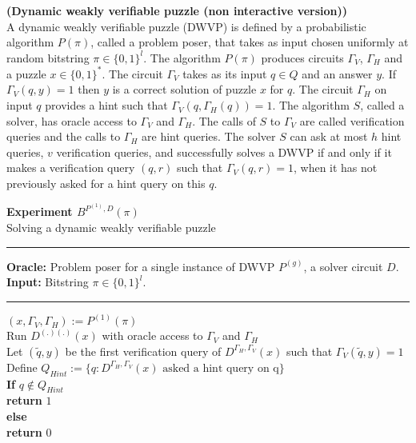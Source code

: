 %
%
%
\begin{definition} {\textbf{(Dynamic weakly verifiable puzzle (non interactive version))}}\\
  A dynamic weakly verifiable puzzle (DWVP) is defined by a probabilistic algorithm $P(\pi)$,
  called a problem poser, that takes as input chosen uniformly at random bitstring $\pi \in \{0,1\}^l$.
  The algorithm $P(\pi)$ produces circuits $\Gamma_{V}$, $\Gamma_{H}$ and a puzzle $x \in \{0,1\}^{*}$.
  The circuit $\Gamma_{V}$ takes as its input $q \in Q$ and an answer $y$.
  If $\Gamma_V(q,y) = 1$ then $y$ is a correct solution of puzzle $x$ for $q$.
  The circuit $\Gamma_H$ on input $q$ provides a hint such that $\Gamma_V(q,\Gamma_H(q)) = 1$.
  The algorithm $S$, called a solver, has oracle access to $\Gamma_V$ and $\Gamma_H$.
  The calls of $S$ to $\Gamma_V$ are called verification queries and the calls to $\Gamma_H$ are hint queries.
  The solver $S$ can ask at most $h$ hint queries, $v$ verification queries, and successfully solves a DWVP if and only if
  it makes a verification query $(q,r)$ such that $\Gamma_V(q,r) = 1$, when it has not previously asked for a hint query on this $q$.
\end{definition}
%
%
%
\begin{codeblock}
  \textbf{Experiment $B^{P^{(1)}, D}(\pi)$} \\
  Solving a dynamic weakly verifiable puzzle
  \medskip

  \hrule

  \medskip

  \textbf{Oracle:} Problem poser for a single instance of DWVP $P^{(g)}$, a solver circuit $D$. \\
  \textbf{Input:}  Bitstring $\pi \in \{0,1\}^{l}$.\\

  \medskip\hrule\medskip

  $(x, \Gamma_V, \Gamma_H) := P^{(1)}(\pi)$ \\
  Run $D^{(.)(.)}(x)$ with oracle access to $\Gamma_V$ and $\Gamma_H$ \\
  \IndI Let $(\widetilde{q},y)$ be the first verification query of $D^{\Gamma_H, \Gamma_V}(x)$ such that $\Gamma_V(\widetilde{q},y) = 1$ \\
  \IndI Define $Q_{Hint} := \{q: \text{$D^{\Gamma_H, \Gamma_V}(x)$ asked a hint query on q} \}$\\
  \textbf{If} $q \notin Q_{Hint}$\\
  \IndI \textbf{return} $1$\\
  \textbf{else}\\
  \IndI \textbf{return} $0$\\
\end{codeblock}
